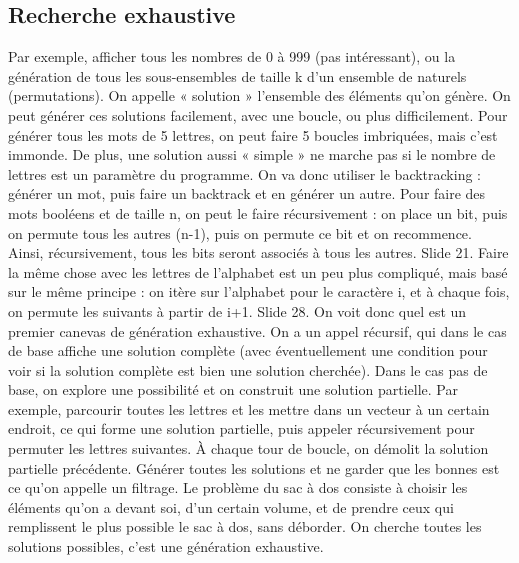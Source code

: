 \documentclass[10pt]{article}
\begin{document}
\subsection{Recherche exhaustive}
Par exemple, afficher tous les nombres de 0 à 999 (pas intéressant), ou la génération de tous les sous-ensembles de taille k d'un ensemble de naturels (permutations). On appelle « solution » l'ensemble des éléments qu'on génère. 
\newline \newline 
On peut générer ces solutions facilement, avec une boucle, ou plus difficilement. Pour générer tous les mots de 5 lettres, on peut faire 5 boucles imbriquées, mais c'est immonde. De plus, une solution aussi « simple » ne marche pas si le nombre de lettres est un paramètre du programme. 
\newline \newline 
On va donc utiliser le backtracking : générer un mot, puis faire un backtrack et en générer un autre. Pour faire des mots booléens et de taille n, on peut le faire récursivement : on place un bit, puis on permute tous les autres (n-1), puis on permute ce bit et on recommence. Ainsi, récursivement, tous les bits seront associés à tous les autres. Slide 21. 
\newline \newline 
Faire la même chose avec les lettres de l'alphabet est un peu plus compliqué, mais basé sur le même principe : on itère sur l'alphabet pour le caractère i, et à chaque fois, on permute les suivants à partir de i+1. Slide 28. 
\newline \newline 
On voit donc quel est un premier canevas de génération exhaustive. On a un appel récursif, qui dans le cas de base affiche une solution complète (avec éventuellement une condition pour voir si la solution complète est bien une solution cherchée). Dans le cas pas de base, on explore une possibilité et on construit une solution partielle. Par exemple, parcourir toutes les lettres et les mettre dans un vecteur à un certain endroit, ce qui forme une solution partielle, puis appeler récursivement pour permuter les lettres suivantes. À chaque tour de boucle, on démolit la solution partielle précédente. 
\newline \newline 
Générer toutes les solutions et ne garder que les bonnes est ce qu'on appelle un filtrage. 
\newline \newline 
Le problème du sac à dos consiste à choisir les éléments qu'on a devant soi, d'un certain volume, et de prendre ceux qui remplissent le plus possible le sac à dos, sans déborder. On cherche toutes les solutions possibles, c'est une génération exhaustive. 
\end{document}
